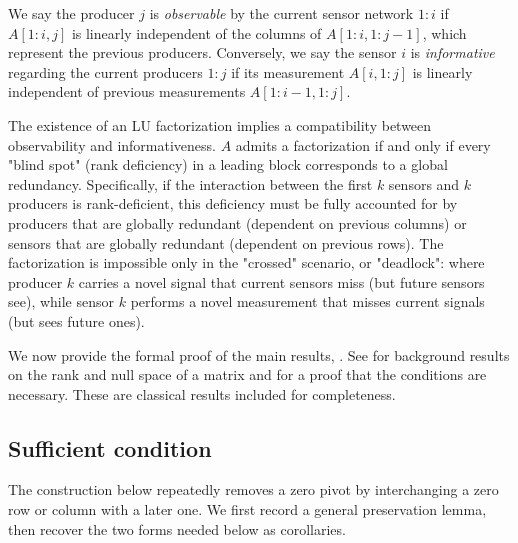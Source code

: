 \documentclass[final]{siamart1116}
\numberwithin{theorem}{section}
\DeclareMathOperator{\nl}{null}
\begin{document}
We say the producer $j$ is \emph{observable} by the current sensor network $1:i$ if $A[1:i,j]$ is linearly independent of the columns of $A[1:i,1:j-1]$, which represent the previous producers. Conversely, we say the sensor $i$ is \emph{informative} regarding the current producers $1:j$ if its measurement $A[i,1:j]$ is linearly independent of previous measurements $A[1:i-1,1:j]$.

The existence of an LU factorization implies a compatibility between observability and informativeness. $A$ admits a factorization if and only if every "blind spot" (rank deficiency) in a leading block corresponds to a global redundancy. Specifically, if the interaction between the first $k$ sensors and $k$ producers is rank-deficient, this deficiency must be fully accounted for by producers that are globally redundant (dependent on previous columns) or sensors that are globally redundant (dependent on previous rows). The factorization is impossible only in the "crossed" scenario, or "deadlock": where producer $k$ carries a novel signal that current sensors miss (but future sensors see), while sensor $k$ performs a novel measurement that misses current signals (but sees future ones).

We now provide the formal proof of the main results, . See  for background results on the rank and null space of a matrix and  for a proof that the conditions are necessary. These are classical results included for completeness.

\subsection{Sufficient condition}

The construction below repeatedly removes a zero pivot by interchanging a zero row or column with a later one. We first record a general preservation lemma, then recover the two forms needed below as corollaries.

\end{document}
